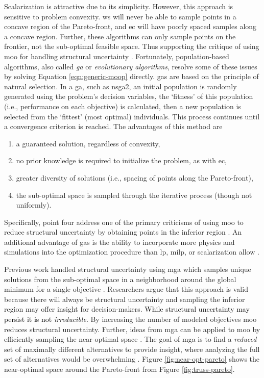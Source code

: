 Scalarization is attractive due to its simplicity. However, this approach is sensitive
to problem convexity. \ac{ws} will never be able to sample points in a concave region 
of the Pareto-front, and \ac{ec} will have poorly spaced samples along a concave 
region. Further, these algorithms can only sample points on the frontier, not the 
sub-optimal feasible space. Thus supporting the critique of using \ac{moo} for 
handling structural uncertainty \cite{decarolis_using_2011}. Fortunately, 
population-based algorithms, also called \textit{\ac{ga}} or \textit{evolutionary algorithms}, resolve some of these issues by solving Equation
\ref{eqn:generic-moop} directly. \Acp{ga} are based on the principle of natural 
selection. In a \ac{ga}, such as \ac{nsga2}, an initial population is randomly 
generated using the problem's decision variables, the `fitness' of this population 
(i.e., performance on each objective) is calculated, then a new population is selected 
from the `fittest' (most optimal) individuals. This process continues until a 
convergence criterion is reached. The advantages of this method are
\begin{enumerate}
    \item a guaranteed solution, regardless of convexity,
    \item no prior knowledge is required to initialize the problem, as with \ac{ec},
    \item greater diversity of solutions (i.e., spacing of points along the Pareto-front),
    \item the sub-optimal space is sampled through the iterative process (though not uniformly).
\end{enumerate}
Specifically, point four address one of the primary criticisms of using \ac{moo} to 
reduce structural uncertainty by obtaining points in the inferior region \cite{loughlin_genetic_2001,zechman_evolutionary_2004, zechman_evolutionary_2013}. An additional advantage of \acp{ga} is the ability to incorporate more physics and simulations into the optimization procedure than \ac{lp}, \ac{milp}, or scalarization allow \cite{loughlin_genetic_2001}. 

Previous work handled structural uncertainty using \ac{mga} which samples unique 
solutions from the sub-optimal space in a neighborhood around the global minimum for a single objective \cite{decarolis_using_2011}. Researchers argue that this approach is valid because there will always be structural uncertainty and sampling the inferior region may offer insight for decision-makers. \textcolor{black}{While structural uncertainty may persist it is not \textit{irreducible}.} By increasing the number of modeled objectives \ac{moo}
reduces structural uncertainty. Further, ideas from \ac{mga} can be applied to \ac{moo} by efficiently sampling the near-optimal space \cite{loughlin_genetic_2001, zechman_evolutionary_2004,zechman_evolutionary_2013,pajares_comparison_2021}. The goal of \ac{mga} is to find a \textit{reduced} set of maximally different alternatives to provide insight, where analyzing the full set of alternatives would
be overwhelming \cite{decarolis_using_2011, pajares_comparison_2021}. Figure \ref{fig:near-opt-pareto} shows the near-optimal space around the Pareto-front from
Figure \ref{fig:truss-pareto}.

